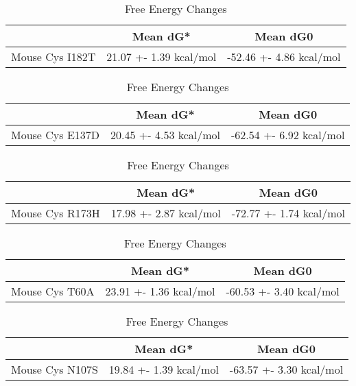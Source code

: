 \begin{table}[ht]
    \centering
    \begin{tabular}{|c|c|c|}
    \hline
      & Mean dG* & Mean dG0 \\
    \hline
Mouse Cys I182T & 21.07 +- 1.39 kcal/mol & -52.46 +- 4.86 kcal/mol \\
    \hline
    \end{tabular}
    \caption{Free Energy Changes}
    \end{table}

\begin{table}[ht]
      \centering
      \begin{tabular}{|c|c|c|}
      \hline
        & Mean dG* & Mean dG0 \\
      \hline
Mouse Cys E137D & 20.45 +- 4.53 kcal/mol & -62.54 +- 6.92 kcal/mol \\
      \hline
      \end{tabular}
      \caption{Free Energy Changes}
      \end{table}

      \begin{table}[ht]
        \centering
        \begin{tabular}{|c|c|c|}
        \hline
          & Mean dG* & Mean dG0 \\
        \hline
Mouse Cys R173H & 17.98 +- 2.87 kcal/mol & -72.77 +- 1.74 kcal/mol \\
        \hline
        \end{tabular}
        \caption{Free Energy Changes}
        \end{table}


        \begin{table}[ht]
          \centering
          \begin{tabular}{|c|c|c|}
          \hline
            & Mean dG* & Mean dG0 \\
          \hline
Mouse Cys T60A & 23.91 +- 1.36 kcal/mol & -60.53 +- 3.40 kcal/mol \\
          \hline
          \end{tabular}
          \caption{Free Energy Changes}
          \end{table}


          \begin{table}[ht]
            \centering
            \begin{tabular}{|c|c|c|}
            \hline
              & Mean dG* & Mean dG0 \\
            \hline
Mouse Cys N107S & 19.84 +- 1.39 kcal/mol & -63.57 +- 3.30 kcal/mol \\
            \hline
            \end{tabular}
            \caption{Free Energy Changes}
            \end{table}


